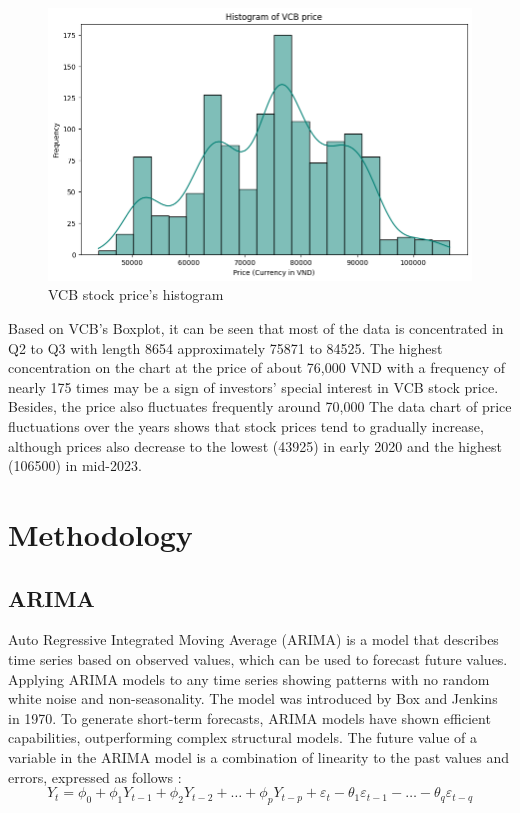 \documentclass{ieeeojies}
\begin{document}
\begin{figure}[H]
\begin{minipage}{0.23\textwidth}
        \includegraphics[width=\textwidth]{bibliography/Figure/VCBhist.png}
        \caption{VCB stock price's histogram}
        \label{fig:3}
    \end{minipage}
\end{figure}

 Based on VCB's Boxplot, it can be seen that most of the data is concentrated in Q2 to Q3 with length 8654 approximately 75871 to 84525.
The highest concentration on the chart at the price of about 76,000 VND with a frequency of nearly 175 times may be a sign of investors' special interest in VCB stock price. Besides, the price also fluctuates frequently around 70,000
The data chart of price fluctuations over the years shows that stock prices tend to gradually increase, although prices also decrease to the lowest (43925) in early 2020 and the highest (106500) in mid-2023.
\section{Methodology}

\subsection{ARIMA}
Auto Regressive Integrated Moving Average (ARIMA) is a model that describes time series based on observed values, which can be used to forecast future values. Applying ARIMA models to any time series showing patterns with no random white noise and non-seasonality. The model was introduced by Box and Jenkins in 1970. To generate short-term forecasts, ARIMA models have shown efficient capabilities, outperforming complex structural models. The future value of a variable in the ARIMA model is a combination of linearity to the past values and errors, expressed as follows \cite{Gillian}:
\begin{equation*}
Y_t = \phi_0 + \phi_1 Y_{t-1} + \phi_2 Y_{t-2} + \ldots + \phi_p Y_{t-p} + \varepsilon_t - \theta_1 \varepsilon_{t-1} - \ldots - \theta_q \varepsilon_{t-q}
\end{equation*}
\end{document}
